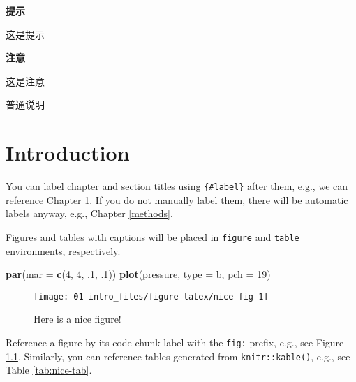 \documentclass[
  lang=cn,
  11pt,
  scheme=chinese,
  chinesefont=nofont,
  bibstyle=apalike]{elegantbook}
\newenvironment{Shaded}{\begin{snugshade}}{\end{snugshade}}
\newcommand{\DataTypeTok}[1]{\textcolor[rgb]{0.13,0.29,0.53}{#1}}
\newcommand{\DecValTok}[1]{\textcolor[rgb]{0.00,0.00,0.81}{#1}}
\newcommand{\FloatTok}[1]{\textcolor[rgb]{0.00,0.00,0.81}{#1}}
\newcommand{\KeywordTok}[1]{\textcolor[rgb]{0.13,0.29,0.53}{\textbf{#1}}}
\newcommand{\NormalTok}[1]{#1}
\newcommand{\StringTok}[1]{\textcolor[rgb]{0.31,0.60,0.02}{#1}}
\begin{document}
\begin{rmdtip}\textcolor[RGB]{81,183,73}{\Large\textbf{提示}}

这是提示

\end{rmdtip}

\begin{rmdnote}\textcolor[RGB]{251,188,5}{\Large\textbf{注意}}

这是注意

\end{rmdnote}

\begin{rmdinfo}

普通说明

\end{rmdinfo}

\hypertarget{intro}{%
\chapter{Introduction}\label{intro}}

You can label chapter and section titles using \texttt{\{\#label\}} after them, e.g., we can reference Chapter \ref{intro}. If you do not manually label them, there will be automatic labels anyway, e.g., Chapter \ref{methods}.

Figures and tables with captions will be placed in \texttt{figure} and \texttt{table} environments, respectively.

\begin{Shaded}
\begin{Highlighting}[]
\KeywordTok{par}\NormalTok{(}\DataTypeTok{mar =} \KeywordTok{c}\NormalTok{(}\DecValTok{4}\NormalTok{, }\DecValTok{4}\NormalTok{, }\FloatTok{.1}\NormalTok{, }\FloatTok{.1}\NormalTok{))}
\KeywordTok{plot}\NormalTok{(pressure, }\DataTypeTok{type =} \StringTok{\textquotesingle{}b\textquotesingle{}}\NormalTok{, }\DataTypeTok{pch =} \DecValTok{19}\NormalTok{)}
\end{Highlighting}
\end{Shaded}

\begin{figure}

{\centering \texttt{[image: 01-intro\_files/figure-latex/nice-fig-1]} 

}

\caption{Here is a nice figure!}\label{fig:nice-fig}
\end{figure}

Reference a figure by its code chunk label with the \texttt{fig:} prefix, e.g., see Figure \ref{fig:nice-fig}. Similarly, you can reference tables generated from \texttt{knitr::kable()}, e.g., see Table \ref{tab:nice-tab}.
\end{document}
